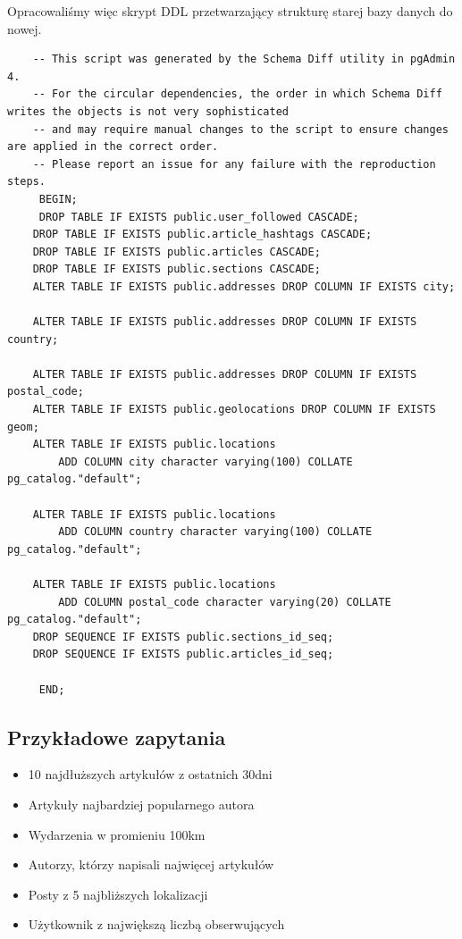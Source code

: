 \documentclass{article}
\begin{document}
Opracowaliśmy więc skrypt DDL przetwarzający strukturę starej bazy danych do nowej.

\begin{lstlisting}
    -- This script was generated by the Schema Diff utility in pgAdmin 4. 
    -- For the circular dependencies, the order in which Schema Diff writes the objects is not very sophisticated 
    -- and may require manual changes to the script to ensure changes are applied in the correct order.
    -- Please report an issue for any failure with the reproduction steps. 
     BEGIN; 
     DROP TABLE IF EXISTS public.user_followed CASCADE;
    DROP TABLE IF EXISTS public.article_hashtags CASCADE;
    DROP TABLE IF EXISTS public.articles CASCADE;
    DROP TABLE IF EXISTS public.sections CASCADE;
    ALTER TABLE IF EXISTS public.addresses DROP COLUMN IF EXISTS city;
    
    ALTER TABLE IF EXISTS public.addresses DROP COLUMN IF EXISTS country;
    
    ALTER TABLE IF EXISTS public.addresses DROP COLUMN IF EXISTS postal_code;
    ALTER TABLE IF EXISTS public.geolocations DROP COLUMN IF EXISTS geom;
    ALTER TABLE IF EXISTS public.locations
        ADD COLUMN city character varying(100) COLLATE pg_catalog."default";
    
    ALTER TABLE IF EXISTS public.locations
        ADD COLUMN country character varying(100) COLLATE pg_catalog."default";
    
    ALTER TABLE IF EXISTS public.locations
        ADD COLUMN postal_code character varying(20) COLLATE pg_catalog."default";
    DROP SEQUENCE IF EXISTS public.sections_id_seq;
    DROP SEQUENCE IF EXISTS public.articles_id_seq;
    
     END;
\end{lstlisting}

\subsection{Przykładowe zapytania}
\begin{itemize}
    \item 10 najdłuższych artykułów z ostatnich 30dni
    \item Artykuły najbardziej popularnego autora
    \item Wydarzenia w promieniu 100km
    \item Autorzy, którzy napisali najwięcej artykułów
    \item Posty z 5 najbliższych lokalizacji 
    \item Użytkownik z największą liczbą obserwujących
\end{itemize}
\end{document}
